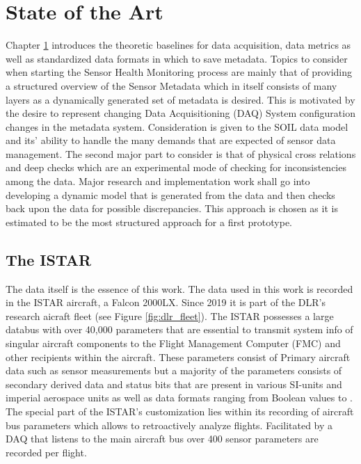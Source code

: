 

\chapter{State of the Art}
\label{chap:2}
Chapter \ref{chap:2} introduces the theoretic baselines for data acquisition, data metrics as well as standardized data formats in which to save metadata. Topics to consider when starting the Sensor Health Monitoring process are mainly that of providing a structured overview of the Sensor Metadata which in itself consists of many layers as a dynamically generated set of metadata is desired. This is motivated by the desire to represent changing Data Acquisitioning (DAQ) System configuration changes in the metadata system. Consideration is given to the SOIL data model and its' ability to handle the many demands that are expected of sensor data management. \cite{behrens_domain-specific_2021}
The second major part to consider is that of physical cross relations and deep checks which are an experimental mode of checking for inconsistencies among the data. Major research and implementation work shall go into developing a dynamic model that is generated from the data and then checks back upon the data for possible discrepancies. This approach is chosen as it is estimated to be the most structured approach for a first prototype.


\section{The ISTAR}
\label{chap:meet_the_istar}
The data itself is the essence of this work. The data used in this work is recorded in the ISTAR aircraft, a Falcon 2000LX. Since 2019 it is part of the DLR's research aicraft fleet (see Figure \ref{fig:dlr_fleet}). The ISTAR possesses a large databus with over 40,000 parameters that are essential to transmit system info of singular aircraft components to the Flight Management Computer (FMC) and other recipients within the aircraft. These parameters consist of Primary aircraft data such as sensor measurements but a majority of the parameters consists of secondary derived data and status bits that are present in various SI-units and imperial aerospace units as well as data formats ranging from Boolean values to . The special part of the ISTAR's customization lies within its recording of aircraft bus parameters which allows to retroactively analyze flights. Facilitated by a DAQ that listens to the main aircraft bus over 400 sensor parameters are recorded per flight.

